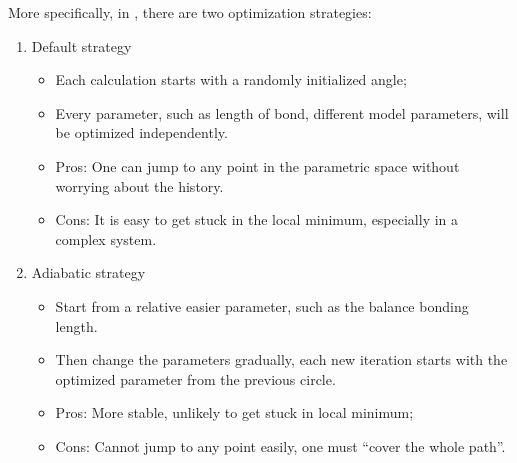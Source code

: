 More specifically, in \cite{UnbChemistry}, there are two optimization strategies:
\begin{enumerate}
    \item Default strategy \begin{itemize}
        \item Each calculation starts with a randomly initialized angle;
        \item Every parameter, such as length of bond, different model parameters, will be optimized independently.
        \item Pros: One can jump to any point in the parametric space without worrying about the history.
        \item Cons: It is easy to get stuck in the local minimum, especially in a complex system.
    \end{itemize}
    \item Adiabatic strategy \begin{itemize}
        \item Start from a relative easier parameter, such as the balance bonding length.
        \item Then change the parameters gradually, each new iteration starts with the optimized parameter from the previous circle.
        \item Pros: More stable, unlikely to get stuck in local minimum;
        \item Cons: Cannot jump to any point easily, one must ``cover the whole path''.
    \end{itemize}
\end{enumerate}